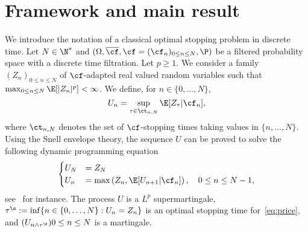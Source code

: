 \section{Framework and main result}\label{Sec_main}

We introduce the notation of a classical optimal stopping problem in discrete time. Let $N\in \N^*$ and $(\Omega, \overline{\cf}, \cf=(\cf_n)_{0 \le n \le N}, \P)$ be a filtered probability space with a discrete time filtration. Let $p\ge 1$. We consider a family $(Z_n)_{0\le n\le N}$ of $\cf$-adapted real valued random variables such that $\max_{0\le n\le N}\E[|Z_n|^p]<\infty$. 
We define, for $n\in \{0,\dots,N\}$,
\begin{equation}
  \label{eq:price}
  U_{n} = \sup_{\tau \in \ct_{n, N}} \E[ Z_{\tau} | \cf_{n}],
\end{equation}
where $\ct_{n,N}$ denotes the set of $\cf$-stopping times taking values in $\{n,\dots,N\}$.
Using the Snell envelope theory, the sequence $U$ can be proved to solve
the following dynamic programming equation
\begin{equation}
  \label{eq:dpp}
  \begin{cases}
    U_{N} & = Z_{N} \\
    U_{n} & = \max\left( Z_{n}, \E[U_{n+1} | \cf_{n}] \right), \quad 0 \le n  \le N-1,
  \end{cases}
\end{equation}
see~\cite[Section 2.2]{LL} for instance. The process $U$ is a $L^p$ supermartingale,  $\tau^\s:=\inf \{n \in \{0,\dots, N\}: U_n=Z_n \}$ is an optimal stopping time for~\eqref{eq:price}, and $(U_{n\wedge \tau^\s}){0 \le n \le N}$ is a martingale.

